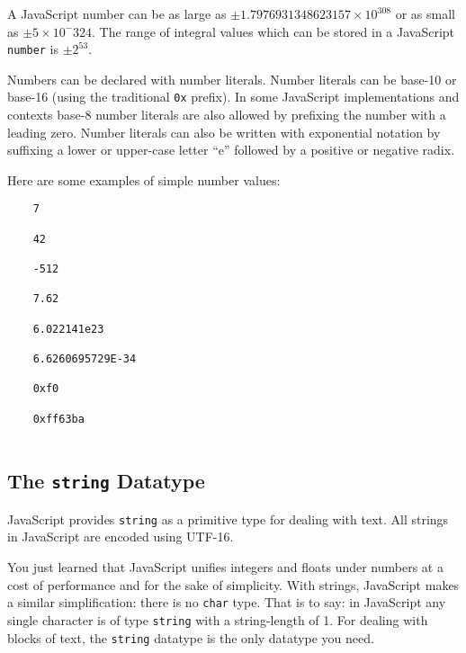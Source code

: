 \documentclass[11pt,letter]{book}
\begin{document}
    A JavaScript number can be as large as $\pm 1.7976931348623157 \times 10^308$ or as small as
    $\pm 5 \times 10^-324$. The range of integral values which can be stored in a JavaScript 
    \texttt{number} is $\pm 2^53$.
    
    Numbers can be declared with number literals. Number literals can be base-10 or base-16 (using 
    the traditional \texttt{0x} prefix). In some JavaScript implementations and contexts base-8 
    number literals are also allowed by prefixing the number with a leading zero. Number literals 
    can also be written with exponential notation by suffixing a lower or upper-case letter ``e'' 
    followed by a positive or negative radix. 
    
    Here are some examples of simple number values:
    
    \begin{verbatim}
    7
    
    42
    
    -512
    
    7.62
    
    6.022141e23
    
    6.6260695729E-34
    
    0xf0
    
    0xff63ba
    
    \end{verbatim}
    
    \subsection{The \texttt{string} Datatype}
    JavaScript provides \texttt{string} as a primitive type for dealing with text. All strings in 
    JavaScript are encoded using UTF-16.
    
    You just learned that JavaScript unifies integers and floats under numbers at a cost of 
    performance and for the sake of simplicity. With strings, JavaScript makes a similar 
    simplification: there is no \texttt{char} type. That is to say: in JavaScript any single 
    character is of type \texttt{string} with a string-length of 1. For dealing with blocks of 
    text, the \texttt{string} datatype is the only datatype you need.
    
\end{document}
